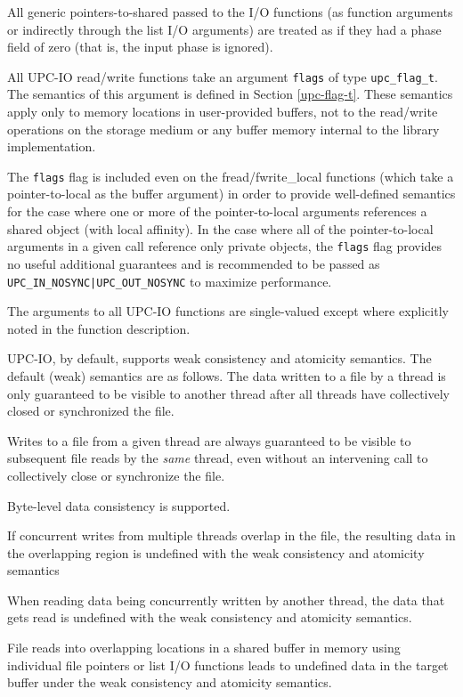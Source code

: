 \np All generic pointers-to-shared passed to the I/O functions (as function
arguments or indirectly through the list I/O arguments) are treated as if
they had a phase field of zero (that is, the input phase is ignored).

\np All UPC-IO read/write functions take an argument {\tt flags}
    of type {\tt upc\_flag\_t}. The semantics of this argument is
    defined in Section \ref{upc-flag-t}. These semantics apply only to
    memory locations in user-provided buffers, not to the read/write
    operations on the storage medium or any buffer memory internal to
    the library implementation.


\np The {\tt flags} flag is included even on the fread/fwrite\_local functions
(which take a pointer-to-local as the buffer argument) in order to provide
well-defined semantics for the case where one or more of the pointer-to-local
arguments references a shared object (with local affinity). In the case where
all of the pointer-to-local arguments in a given call reference only private
objects, the {\tt flags} flag provides no useful additional guarantees and is
recommended to be passed as {\tt UPC\_IN\_NOSYNC|UPC\_OUT\_NOSYNC} to maximize performance.

\np The arguments to all UPC-IO functions are single-valued except where 
    explicitly noted in the function description.

\np UPC-IO, by default, supports weak consistency and atomicity semantics. The
default (weak) semantics are as follows. The data written to a file by a thread is
only guaranteed to be visible to another thread after all threads have
collectively closed or synchronized the file.

\np Writes to a file from a given thread are always guaranteed to be visible to
subsequent file reads by the \textit{same} thread, even without an intervening
call to collectively close or synchronize the file.

\np Byte-level data consistency is supported.

\np If concurrent writes from multiple threads overlap in the file, the
resulting data in the overlapping region is undefined with the weak
consistency and atomicity semantics

\np When reading data being concurrently written by another thread, the data
that gets read is undefined with the weak consistency and atomicity
semantics.

\np File reads into overlapping locations in a shared buffer in memory using individual file
pointers or list I/O functions leads to undefined data in the target buffer under the
weak consistency and atomicity semantics.

